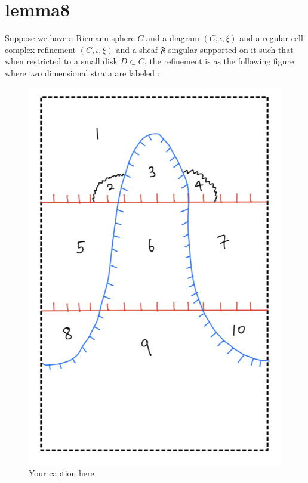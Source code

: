 \section{lemma8}
\begin{lemma}
\end{lemma}

Suppose we have a Riemann sphere $C$ and a diagram $(C,\iota,\xi)$ and a regular cell complex refinement $\overline{(C,\iota,\xi)}$ and a sheaf $\mathfrak{F}$ singular supported on it such that when restricted to a small disk $D\subset C$, the refinement is as the following figure where two dimensional strata are labeled :

\begin{figure}[H] %
    \centering
    \includegraphics[width=\linewidth]{diagrams/lemma8/1.png} %
    \caption{Your caption here}
    \label{fig:your-label}
\end{figure}

